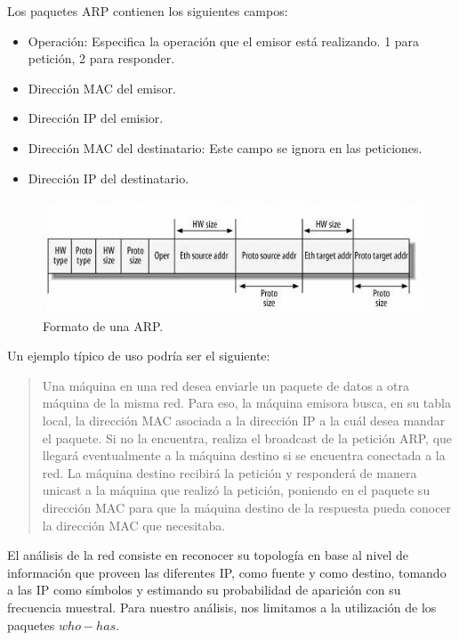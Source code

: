 \documentclass[10pt, a4paper]{article}
\begin{document}
Los paquetes ARP contienen los siguientes campos:
\begin{itemize}
\item Operación: Especifica la operación que el emisor está realizando. 1 para petición, 2 para responder.
\item Dirección MAC del emisor.
\item Dirección IP del emisior.
\item Dirección MAC del destinatario: Este campo se ignora en las peticiones.
\item Dirección IP del destinatario.
\end{itemize}
\begin{figure}[H] %
\begin{center}
\includegraphics[width=350pt]{../imgs/arp.jpg}
\caption{Formato de una ARP.}
\end{center}
\end{figure}

Un ejemplo típico de uso podría ser el siguiente:

\begin{quotation}
Una máquina en una red desea enviarle un paquete de datos a otra máquina de la misma red. Para eso, la máquina emisora busca, en su tabla local, la dirección MAC asociada a la dirección IP a la cuál desea mandar el paquete. Si no la encuentra, realiza el broadcast de la petición ARP, que llegará eventualmente a la máquina destino si se encuentra conectada a la red. 
La máquina destino recibirá la petición y responderá de manera unicast a la máquina que realizó la petición, poniendo en el paquete su dirección MAC para que la máquina destino de la respuesta pueda conocer la dirección MAC que necesitaba.
\end{quotation}

El análisis de la red consiste en reconocer su topología en base al nivel de información que proveen las diferentes IP, como fuente y como destino, tomando a las IP como símbolos y estimando su probabilidad de aparición con su frecuencia muestral. Para nuestro análisis, nos limitamos a la utilización de los paquetes $who-has$.
\end{document}
